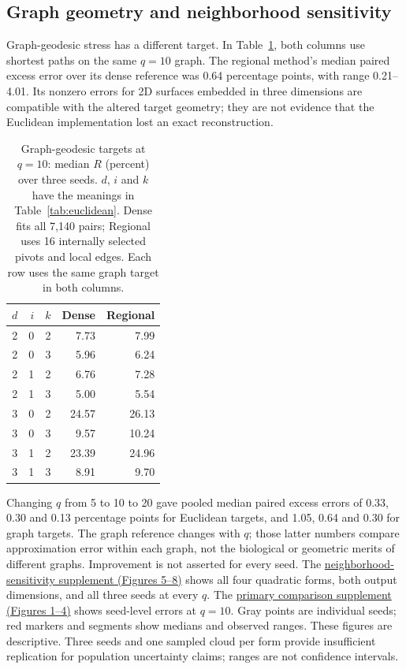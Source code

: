 \documentclass[11pt,letterpaper]{article}
\begin{document}
\clearpage\subsection{Graph geometry and neighborhood sensitivity}
Graph-geodesic stress has a different target. In Table~\ref{tab:geodesic}, both
columns use shortest paths on the same $q=10$ graph. The regional method's median
paired excess error over its dense reference was 0.64 percentage points, with
range 0.21--4.01. Its nonzero errors for 2D surfaces embedded in three dimensions
are compatible with the altered target geometry; they are not evidence that
the Euclidean implementation lost an exact reconstruction.

\begin{table}[ht]\centering
\caption{Graph-geodesic targets at $q=10$: median $R$ (percent) over three seeds.
$d$, $i$ and $k$ have the meanings in Table~\ref{tab:euclidean}. Dense fits all
7,140 pairs; Regional uses 16 internally selected pivots and local edges.
Each row uses the same graph target in both columns.}\label{tab:geodesic}
\begin{tabular}{rrr rr}\toprule
$d$ & $i$ & $k$ & Dense & Regional\\\midrule
2 & 0 & 2 & 7.73 & 7.99 \\
2 & 0 & 3 & 5.96 & 6.24 \\
2 & 1 & 2 & 6.76 & 7.28 \\
2 & 1 & 3 & 5.00 & 5.54 \\
3 & 0 & 2 & 24.57 & 26.13 \\
3 & 0 & 3 & 9.57 & 10.24 \\
3 & 1 & 2 & 23.39 & 24.96 \\
3 & 1 & 3 & 8.91 & 9.70 \\
\bottomrule\end{tabular}\end{table}

Changing $q$ from 5 to 10 to 20 gave pooled median paired excess errors of
0.33, 0.30 and 0.13 percentage points for Euclidean targets, and 1.05, 0.64 and
0.30 for graph targets. The graph reference changes with $q$; those latter
numbers compare approximation error within each graph, not the biological or
geometric merits of different graphs. Improvement is not asserted for every seed.
The \href{results/neighborhood-sensitivity.pdf}
{neighborhood-sensitivity supplement (Figures 5--8)} shows all four quadratic
forms, both output dimensions, and all three seeds at every $q$.
The \href{results/error-comparison.pdf}
{primary comparison supplement (Figures 1--4)} shows seed-level errors at $q=10$.
Gray points are individual seeds; red markers and segments show medians and
observed ranges. These figures are descriptive. Three seeds and one sampled
cloud per form provide insufficient replication for population uncertainty
claims; ranges are not confidence intervals.
\end{document}
